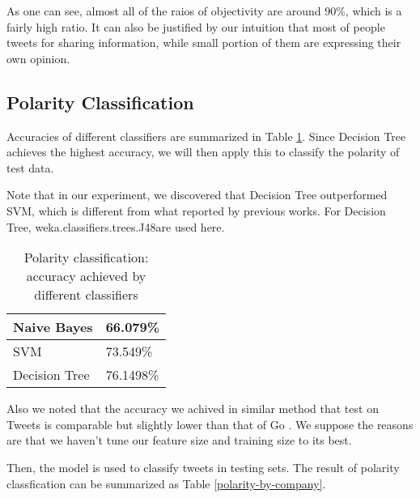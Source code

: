 \documentclass[12pt]{article}
\begin{document}
As one can see, almost all of the raios of objectivity are around $90\%$, which is a fairly high ratio. It can also be justified by our intuition that most of people tweets for sharing information, while small portion of them are expressing their own opinion.

\subsection{Polarity Classification}
Accuracies of different classifiers are summarized in Table \ref{classifiers-polarity}. Since Decision Tree achieves the highest accuracy, we will then apply this to classify the polarity of test data.

Note that in our experiment, we discovered that Decision Tree outperformed SVM, which is different from what reported by previous works. For Decision Tree, weka.classifiers.trees.J48are used here.

\begin{table}
\begin{center}
    \begin{tabular}{ | l || l | }
        \hline
        Naive Bayes &  66.079\% \\ \hline
        SVM & 73.549\% \\ \hline
        Decision Tree & 76.1498\% \\ \hline
    \end{tabular}
\caption{Polarity classification: accuracy achieved by different classifiers}
\label{classifiers-polarity}
\end{center}
\end{table}

Also we noted that the accuracy we achived in similar method that test on Tweets is comparable but slightly lower than that of Go \etal \cite{Go:09}. We suppose the reasons are that we haven't tune our feature size and training size to its best.

Then, the model is used to classify tweets in testing sets. The result of polarity classfication can be summarized as Table \ref{polarity-by-company}.
\end{document}
